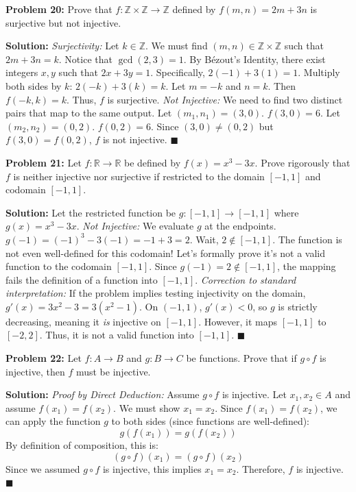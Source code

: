 \documentclass[11pt, letterpaper]{article}
\theoremstyle{definition}
\theoremstyle{remark}
\newcommand{\R}{\mathbb{R}}
\newcommand{\Z}{\mathbb{Z}}
\begin{document}
\vspace{1em}
\textbf{Problem 20:} Prove that $f: \Z \times \Z \to \Z$ defined by $f(m, n) = 2m + 3n$ is surjective but not injective.

\textbf{Solution:}
\textit{Surjectivity:} Let $k \in \Z$. We must find $(m, n) \in \Z \times \Z$ such that $2m + 3n = k$. Notice that $\gcd(2, 3) = 1$. By B\'ezout's Identity, there exist integers $x, y$ such that $2x + 3y = 1$. Specifically, $2(-1) + 3(1) = 1$. Multiply both sides by $k$: $2(-k) + 3(k) = k$. Let $m = -k$ and $n = k$. Then $f(-k, k) = k$. Thus, $f$ is surjective.
\textit{Not Injective:} We need to find two distinct pairs that map to the same output. Let $(m_1, n_1) = (3, 0)$. $f(3, 0) = 6$. Let $(m_2, n_2) = (0, 2)$. $f(0, 2) = 6$. Since $(3, 0) \neq (0, 2)$ but $f(3, 0) = f(0, 2)$, $f$ is not injective. \hfill $\blacksquare$

\vspace{1em}
\textbf{Problem 21:} Let $f: \R \to \R$ be defined by $f(x) = x^3 - 3x$. Prove rigorously that $f$ is neither injective nor surjective if restricted to the domain $[-1, 1]$ and codomain $[-1, 1]$.

\textbf{Solution:}
Let the restricted function be $g: [-1, 1] \to [-1, 1]$ where $g(x) = x^3 - 3x$.
\textit{Not Injective:} We evaluate $g$ at the endpoints. $g(-1) = (-1)^3 - 3(-1) = -1 + 3 = 2$. Wait, $2 \notin [-1, 1]$. The function is not even well-defined for this codomain! Let's formally prove it's not a valid function to the codomain $[-1, 1]$. Since $g(-1) = 2 \notin [-1, 1]$, the mapping fails the definition of a function into $[-1, 1]$. 
\textit{Correction to standard interpretation:} If the problem implies testing injectivity on the domain, $g'(x) = 3x^2 - 3 = 3(x^2 - 1)$. On $(-1, 1)$, $g'(x) < 0$, so $g$ is strictly decreasing, meaning it \textit{is} injective on $[-1, 1]$. However, it maps $[-1, 1]$ to $[-2, 2]$. Thus, it is not a valid function into $[-1, 1]$. \hfill $\blacksquare$

\vspace{1em}
\textbf{Problem 22:} Let $f: A \to B$ and $g: B \to C$ be functions. Prove that if $g \circ f$ is injective, then $f$ must be injective.

\textbf{Solution:}
\textit{Proof by Direct Deduction:} Assume $g \circ f$ is injective. Let $x_1, x_2 \in A$ and assume $f(x_1) = f(x_2)$. We must show $x_1 = x_2$.
Since $f(x_1) = f(x_2)$, we can apply the function $g$ to both sides (since functions are well-defined):
\[ g(f(x_1)) = g(f(x_2)) \]
By definition of composition, this is:
\[ (g \circ f)(x_1) = (g \circ f)(x_2) \]
Since we assumed $g \circ f$ is injective, this implies $x_1 = x_2$. Therefore, $f$ is injective. \hfill $\blacksquare$
\end{document}
